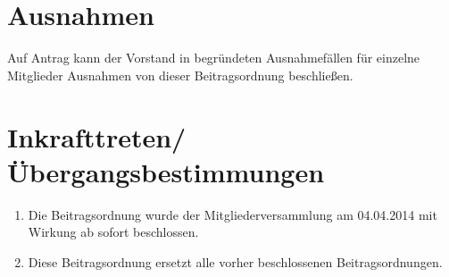 \documentclass[a4paper, 12pt]{scrartcl}
\begin{document}
\section{Ausnahmen}
Auf Antrag kann der Vorstand in begründeten Ausnahmefällen für einzelne Mitglieder Ausnahmen von dieser Beitragsordnung beschließen.

\section{Inkrafttreten/Übergangsbestimmungen}
\begin{enumerate}
  \item Die Beitragsordnung wurde der Mitgliederversammlung am 04.04.2014 mit Wirkung ab sofort beschlossen.
  \item Diese Beitragsordnung ersetzt alle vorher beschlossenen Beitragsordnungen.
\end{enumerate}
\end{document}

